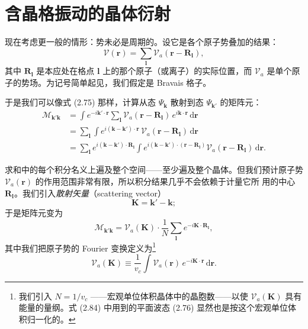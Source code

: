 \section{含晶格振动的晶体衍射}

现在考虑更一般的情形：势未必是周期的。设它是各个原子势叠加的结果：
\begin{equation*}
\mathcal{V}(\mathbf{r}) = \sum_{\boldsymbol{l}} \mathcal{V}_a(\mathbf{r} - \mathbf{R}_{\boldsymbol{l}}),
\tag{2.83}
\end{equation*}
其中 $\mathbf{R}_{\boldsymbol{l}}$
是本应处在格点 $\boldsymbol{l}$ 上的那个原子（或离子）的实际位置，而
$\mathcal{V}_a$ 是单个原子的势场。为记号简单起见，我们假定是 Bravais 格子。

于是我们可以像式 (2.75) 那样，计算从态 $\Psi_{\mathbf{k}}$ 散射到态
$\Psi_{\mathbf{k}'}$ 的矩阵元：
\begin{align*}
\mathcal{M}_{\mathbf{k}'\mathbf{k}}
&= \int e^{-i\mathbf{k}'\cdot\mathbf{r}} \sum_{\boldsymbol{l}}
\mathcal{V}_a(\mathbf{r} - \mathbf{R}_{\boldsymbol{l}})\,
e^{i\mathbf{k}\cdot\mathbf{r}}\, \mathrm{d}\mathbf{r} \\
&= \sum_{\boldsymbol{l}} \int e^{i(\mathbf{k}-\mathbf{k}')\cdot\mathbf{r}}\,
\mathcal{V}_a(\mathbf{r} - \mathbf{R}_{\boldsymbol{l}})\, \mathrm{d}\mathbf{r} \\
&= \sum_{\boldsymbol{l}} e^{i(\mathbf{k}-\mathbf{k}')\cdot\mathbf{R}_{\boldsymbol{l}}}
\int e^{i(\mathbf{k}-\mathbf{k}')\cdot(\mathbf{r}-\mathbf{R}_{\boldsymbol{l}})}
\mathcal{V}_a(\mathbf{r} - \mathbf{R}_{\boldsymbol{l}})\, \mathrm{d}\mathbf{r}.
\tag{2.84}
\end{align*}

求和中的每个积分名义上遍及整个空间——至少遍及整个晶体。但我们预计原子势
$\mathcal{V}_a(\mathbf{r})$ 的作用范围非常有限，所以积分结果几乎不会依赖于计量它所
用的中心 $\mathbf{R}_{\boldsymbol{l}}$。我们引入\emph{散射矢量}（scattering vector）
\begin{equation*}
\mathbf{K} = \mathbf{k}' - \mathbf{k};
\tag{2.85}
\end{equation*}
于是矩阵元变为
\begin{equation*}
\mathcal{M}_{\mathbf{k}'\mathbf{k}} = \mathcal{V}_a(\mathbf{K}) \cdot
\frac{1}{N} \sum_{\boldsymbol{l}} e^{-i\mathbf{K}\cdot\mathbf{R}_{\boldsymbol{l}}},
\tag{2.86}
\end{equation*}
其中我们把原子势的 Fourier 变换定义为\footnote{我们引入 $N = 1/v_c$
——宏观单位体积晶体中的晶胞数——以使 $\mathcal{V}_a(\mathbf{K})$
具有能量的量纲。式 (2.84) 中用到的平面波态 (2.76)
显然也是按这个宏观单位体积归一化的。}
\begin{equation*}
\mathcal{V}_a(\mathbf{K}) \equiv \frac{1}{v_c} \int
\mathcal{V}_a(\mathbf{r})\, e^{-i\mathbf{K}\cdot\mathbf{r}}\, \mathrm{d}\mathbf{r}.
\tag{2.87}
\end{equation*}

